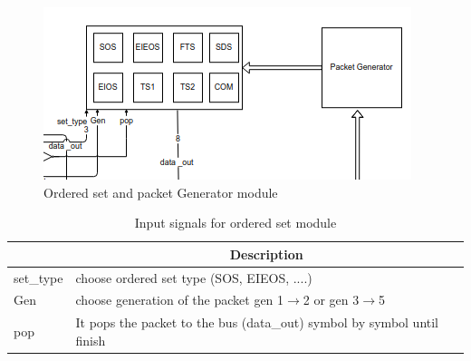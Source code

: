 \begin{figure}[H]
  \centering
  \includegraphics{images/ordered_set.png}
  \caption{Ordered set and packet Generator module}
\end{figure}


\begin{table}[H]
    \caption{Input signals for ordered set module}
    \centering
  \begin{tabular}{ |m{26mm}|m{60mm}|  }
\hline
\rowcolor{Gray}
\multicolumn{1}{|c|}{\textbf{Name} } 
& \multicolumn{1}{|c|}{\textbf{Description}}\\
\hline
 set\_type  &  choose ordered set type (SOS, EIEOS, ....) \\ \hline 
  Gen & choose generation of the packet gen 1$\longrightarrow $2 or gen 3$\longrightarrow$5 \\ 
 \hline 
 pop & It pops the packet to the bus (data\_out) symbol by symbol until finish \\
 \hline 


\end{tabular}
\end{table}

